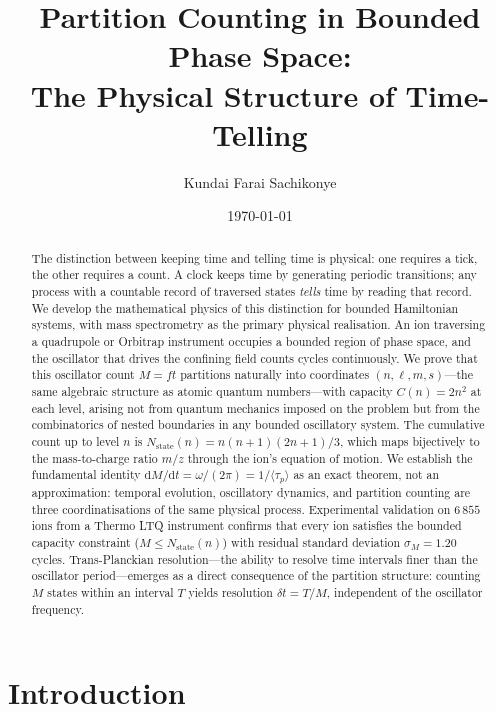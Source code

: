 \documentclass[twocolumn,10pt]{article}
\title{Partition Counting in Bounded Phase Space:\\
The Physical Structure of Time-Telling}
\author[1]{Kundai Farai Sachikonye}
\affil[1]{Technical University of Munich\\
\texttt{kundai.sachikonye@wzw.tum.de}}
\date{\today}
\newcommand{\tp}{\langle\tau_p\rangle}
\newcommand{\dM}{\mathrm{d}M}
\newcommand{\dt}{\mathrm{d}t}
\begin{document}
\maketitle

\begin{abstract}
The distinction between keeping time and telling time is physical: one requires a tick, the other requires a count. A clock keeps time by generating periodic transitions; any process with a countable record of traversed states \emph{tells} time by reading that record. We develop the mathematical physics of this distinction for bounded Hamiltonian systems, with mass spectrometry as the primary physical realisation. An ion traversing a quadrupole or Orbitrap instrument occupies a bounded region of phase space, and the oscillator that drives the confining field counts cycles continuously. We prove that this oscillator count $M = ft$ partitions naturally into coordinates $(n, \ell, m, s)$---the same algebraic structure as atomic quantum numbers---with capacity $C(n) = 2n^2$ at each level, arising not from quantum mechanics imposed on the problem but from the combinatorics of nested boundaries in any bounded oscillatory system. The cumulative count up to level $n$ is $N_{\mathrm{state}}(n) = n(n+1)(2n+1)/3$, which maps bijectively to the mass-to-charge ratio $m/z$ through the ion's equation of motion. We establish the fundamental identity $\dM/\dt = \omega/(2\pi) = 1/\tp$ as an exact theorem, not an approximation: temporal evolution, oscillatory dynamics, and partition counting are three coordinatisations of the same physical process. Experimental validation on $6\,855$ ions from a Thermo LTQ instrument confirms that every ion satisfies the bounded capacity constraint ($M \leq N_{\mathrm{state}}(n)$) with residual standard deviation $\sigma_M = 1.20$ cycles. Trans-Planckian resolution---the ability to resolve time intervals finer than the oscillator period---emerges as a direct consequence of the partition structure: counting $M$ states within an interval $T$ yields resolution $\delta t = T/M$, independent of the oscillator frequency.
\end{abstract}

\section{Introduction}
\label{sec:introduction}
\end{document}
